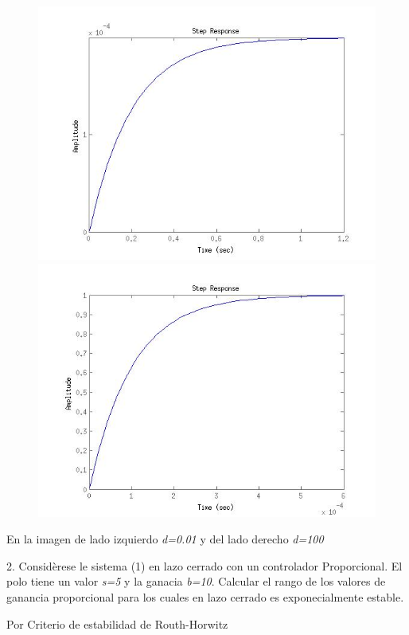\documentclass{tufte-handout}
\begin{document}
\begin{figure}[htp]
\centering
\includegraphics[scale=0.2]{Imagenes/p1P.jpg}
\includegraphics[scale=0.2]{Imagenes/piG.jpg}
\end{figure}

En la imagen de lado izquierdo \emph{d=0.01} y del lado derecho \emph{d=100}

2. Consid\`erese le sistema (1) en lazo cerrado con un controlador  Proporcional. El polo tiene un valor \emph{s=5} y la ganacia \emph{b=10}. Calcular el rango de los valores de ganancia proporcional para los cuales en lazo cerrado es exponecialmente estable. 

\begin{center}Por Criterio de estabilidad de Routh-Horwitz\end{center}
\end{document}
